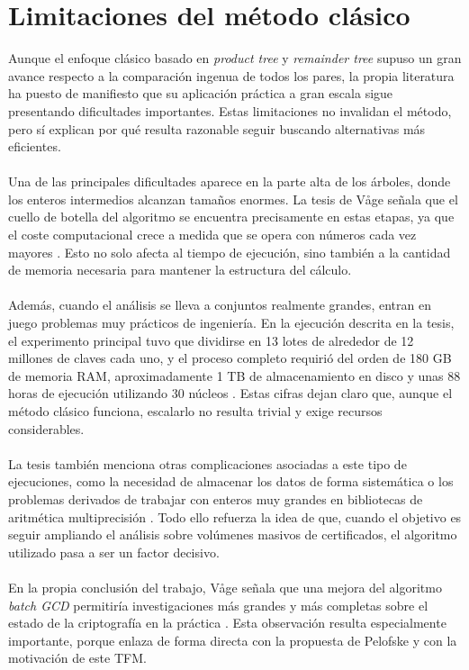\section{Limitaciones del método clásico}

Aunque el enfoque clásico basado en \textit{product tree} y \textit{remainder tree} supuso un gran avance respecto a la comparación ingenua de todos los pares, la propia literatura ha puesto de manifiesto que su aplicación práctica a gran escala sigue presentando dificultades importantes. Estas limitaciones no invalidan el método, pero sí explican por qué resulta razonable seguir buscando alternativas más eficientes.
\\
\\
Una de las principales dificultades aparece en la parte alta de los árboles, donde los enteros intermedios alcanzan tamaños enormes. La tesis de Våge señala que el cuello de botella del algoritmo se encuentra precisamente en estas etapas, ya que el coste computacional crece a medida que se opera con números cada vez mayores \cite{vage2022finding}. Esto no solo afecta al tiempo de ejecución, sino también a la cantidad de memoria necesaria para mantener la estructura del cálculo.
\\
\\
Además, cuando el análisis se lleva a conjuntos realmente grandes, entran en juego problemas muy prácticos de ingeniería. En la ejecución descrita en la tesis, el experimento principal tuvo que dividirse en 13 lotes de alrededor de 12 millones de claves cada uno, y el proceso completo requirió del orden de 180 GB de memoria RAM, aproximadamente 1 TB de almacenamiento en disco y unas 88 horas de ejecución utilizando 30 núcleos \cite{vage2022finding}. Estas cifras dejan claro que, aunque el método clásico funciona, escalarlo no resulta trivial y exige recursos considerables.
\\
\\
La tesis también menciona otras complicaciones asociadas a este tipo de ejecuciones, como la necesidad de almacenar los datos de forma sistemática o los problemas derivados de trabajar con enteros muy grandes en bibliotecas de aritmética multiprecisión \cite{vage2022finding}. Todo ello refuerza la idea de que, cuando el objetivo es seguir ampliando el análisis sobre volúmenes masivos de certificados, el algoritmo utilizado pasa a ser un factor decisivo.
\\
\\
En la propia conclusión del trabajo, Våge señala que una mejora del algoritmo \textit{batch GCD} permitiría investigaciones más grandes y más completas sobre el estado de la criptografía en la práctica \cite{vage2022finding}. Esta observación resulta especialmente importante, porque enlaza de forma directa con la propuesta de Pelofske y con la motivación de este TFM.
